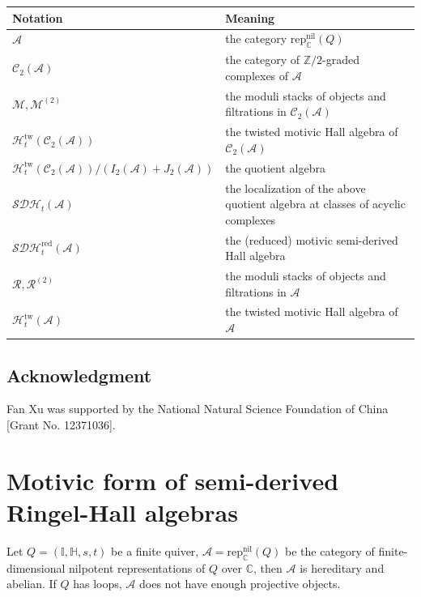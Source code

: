 \documentclass[12pt]{amsart}
\theoremstyle{definition}
\numberwithin{equation}{section}
\begin{document}
\begin{center}
\begin{tabular}{@{}p{}p{}@{}}
\hline
Notation & Meaning \\
\hline
$\mathcal{A}$ & the category $\mathrm{rep}^{\mathrm{nil}}_{\mathbb{C}}(Q)$ \\
$\mathcal{C}_2(\mathcal{A})$ & the category of $\mathbb{Z}/2$-graded complexes of $\mathcal{A}$ \\
$\mathcal{M},\mathcal{M}^{(2)}$ & the moduli stacks of objects and filtrations in $\mathcal{C}_2(\mathcal{A})$ \\
$ \mathcal{H}_t^{\mathrm{tw}}(\mathcal{C}_2(\mathcal{A}))  $ & the twisted motivic Hall algebra of $\mathcal{C}_2(\mathcal{A})$\\
$ \mathcal{H}_t^{\mathrm{tw}}(\mathcal{C}_2(\mathcal{A}))/(I_2(\mathcal{A})+J_2(\mathcal{A})) $ & the quotient algebra \\
$\mathcal{SDH}_t(\mathcal{A})$ & the localization of the above quotient algebra at classes of acyclic complexes \\
$\mathcal{SDH}_t^{\mathrm{red}}(\mathcal{A})$ & the (reduced) motivic semi-derived Hall algebra \\
$ \mathcal{R},\mathcal{R}^{(2)} $ & the moduli stacks of objects and filtrations in $ \mathcal{A} $\\
$ \mathcal{H}_t^{\mathrm{tw}}(\mathcal{A})  $ & the twisted motivic Hall algebra of $\mathcal{A}$\\
\hline
\end{tabular}
\end{center}


\subsection{Acknowledgment}\;

Fan Xu was supported by the National Natural Science Foundation of China [Grant No. 12371036].

\newpage


\section{Motivic form of semi-derived Ringel-Hall algebras}
\label{Motivic form of semi-derived Ringel-Hall algebras}

Let $ Q = (\mathbb{I},\mathbb{H},s,t)$ be a finite quiver, $ \mathcal{A}= \mathrm{rep}^{\mathrm{nil}}_{\mathbb{C}}(Q) $ be the category of finite-dimensional nilpotent representations of $ Q $ over $ \mathbb{C} $, then $ \mathcal{A} $ is hereditary and abelian. 
If $ Q $ has loops, $ \mathcal{A} $ does not have enough projective objects.
\end{document}

